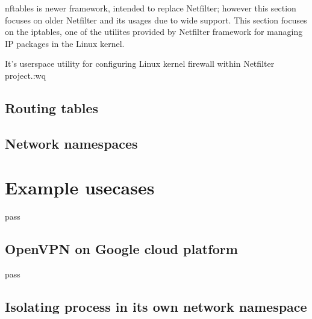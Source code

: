 \documentclass[times, utf8, seminar, english]{fer}
\begin{document}
nftables is newer framework, intended to replace Netfilter; however this section focuses on older Netfilter and its usages due to wide support.
This section focuses on the iptables, one of the utilites provided by Netfilter framework for managing IP packages in the Linux kernel.

It's userspace utility for configuring Linux kernel firewall within Netfilter project.:wq



\section{Routing tables}
\section{Network namespaces}


\chapter{Example usecases}
pass
\section{OpenVPN on Google cloud platform}
pass
\section{Isolating process in its own network namespace}



\end{document}
